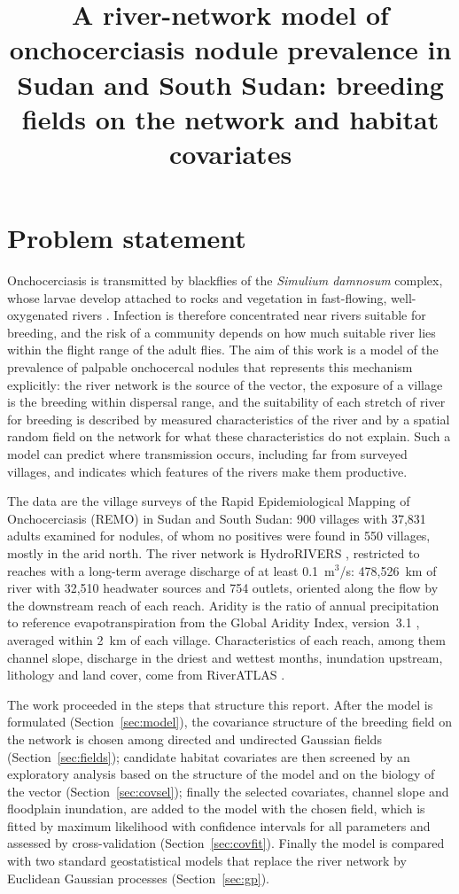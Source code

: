 \documentclass[11pt,a4paper]{article}
\title{A river-network model of onchocerciasis nodule prevalence in Sudan and South Sudan: breeding fields on the network and habitat covariates}
\author{}
\date{}
\begin{document}
\maketitle

\section{Problem statement}

Onchocerciasis is transmitted by blackflies of the \textit{Simulium damnosum} complex, whose larvae develop attached to rocks and vegetation in fast-flowing, well-oxygenated rivers \citep{crosskey1990}. Infection is therefore concentrated near rivers suitable for breeding, and the risk of a community depends on how much suitable river lies within the flight range of the adult flies. The aim of this work is a model of the prevalence of palpable onchocercal nodules that represents this mechanism explicitly: the river network is the source of the vector, the exposure of a village is the breeding within dispersal range, and the suitability of each stretch of river for breeding is described by measured characteristics of the river and by a spatial random field on the network for what these characteristics do not explain. Such a model can predict where transmission occurs, including far from surveyed villages, and indicates which features of the rivers make them productive.

The data are the village surveys of the Rapid Epidemiological Mapping of Onchocerciasis (REMO) in Sudan and South Sudan: 900 villages with 37{,}831 adults examined for nodules, of whom no positives were found in 550 villages, mostly in the arid north. The river network is HydroRIVERS \citep{lehner2013}, restricted to reaches with a long-term average discharge of at least 0.1~m$^3$/s: 478{,}526~km of river with 32{,}510 headwater sources and 754 outlets, oriented along the flow by the downstream reach of each reach. Aridity is the ratio of annual precipitation to reference evapotranspiration from the Global Aridity Index, version~3.1 \citep{zomer2022}, averaged within 2~km of each village. Characteristics of each reach, among them channel slope, discharge in the driest and wettest months, inundation upstream, lithology and land cover, come from RiverATLAS \citep{linke2019}.

The work proceeded in the steps that structure this report. After the model is formulated (Section~\ref{sec:model}), the covariance structure of the breeding field on the network is chosen among directed and undirected Gaussian fields (Section~\ref{sec:fields}); candidate habitat covariates are then screened by an exploratory analysis based on the structure of the model and on the biology of the vector (Section~\ref{sec:covsel}); finally the selected covariates, channel slope and floodplain inundation, are added to the model with the chosen field, which is fitted by maximum likelihood with confidence intervals for all parameters and assessed by cross-validation (Section~\ref{sec:covfit}). Finally the model is compared with two standard geostatistical models that replace the river network by Euclidean Gaussian processes (Section~\ref{sec:gp}).
\end{document}

